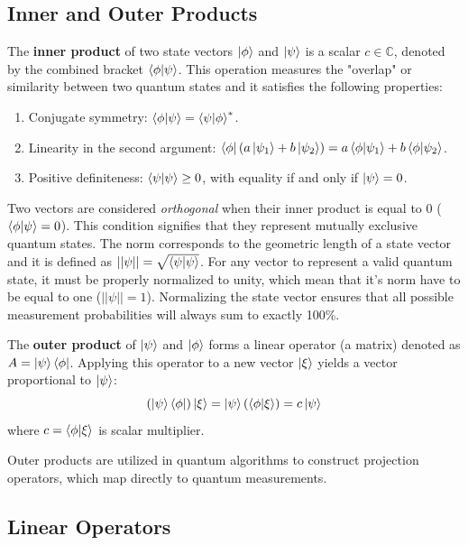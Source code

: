 \subsection{Inner and Outer Products}

The \textbf{inner product} of two state vectors $\ket{\phi}$ and $\ket{\psi}$ is a scalar $c \in \mathbb{C}$, 
denoted by the combined bracket $\braket{\phi}{\psi}$.
%
%
This operation measures the "overlap" or similarity between two quantum states and it satisfies the following properties:
%
%
\begin{enumerate}
    \item Conjugate symmetry: $\braket{\phi}{\psi} = \braket{\psi}{\phi}^*$.
    \item Linearity in the second argument: $\bra{\phi} (a\ket{\psi_1} + b\ket{\psi_2}) = a\braket{\phi}{\psi_1} + b\braket{\phi}{\psi_2}$.
    \item Positive definiteness: $\braket{\psi}{\psi} \geq 0$, with equality if and only if $\ket{\psi} = 0$.
\end{enumerate}
%
%

Two vectors are considered \textit{orthogonal} when their inner product is equal to 0 ($\braket{\phi}{\psi} = 0$). 
%
%
This condition signifies that they represent mutually exclusive quantum states.
%
%
The norm corresponds to the geometric length of a state vector and it is defined as $||\psi|| = \sqrt{\braket{\psi}{\psi}}$.
%
%
For any vector to represent a valid quantum state, 
it must be properly normalized to unity, which mean that it's norm have to be equal to one ($||\psi|| = 1$).
%
%
Normalizing the state vector ensures that all possible measurement probabilities will always sum to exactly 100\%.
%
%

The \textbf{outer product} of $\ket{\psi}$ and $\ket{\phi}$ forms a linear operator (a matrix) denoted as $A = \ket{\psi}\bra{\phi}$.
%
%
Applying this operator to a new vector $\ket{\xi}$ yields a vector proportional to $\ket{\psi}$:
\bigskip
\begin{equation}
    (\ket{\psi}\bra{\phi})\ket{\xi} = \ket{\psi}(\braket{\phi}{\xi}) = c \ket{\psi}
\end{equation}
\bigskip
where $c = \braket{\phi}{\xi}$ is scalar multiplier.
%
%

Outer products are utilized in quantum algorithms to construct projection operators, which map directly to quantum measurements.
%
%
\subsection{Linear Operators}

